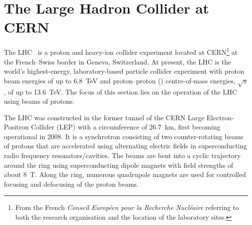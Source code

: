 \section{The Large Hadron Collider at CERN}%
\label{sec:lhc}

The LHC~\cite{Evans:2008zzb} is a proton and heavy-ion collider experiment
located at CERN\footnote{From the French \emph{Conseil Européen pour la
    Recherche Nucléaire} referring to both the research organisation and the
  location of the laboratory sites.} at the French--Swiss border in Geneva,
Switzerland. At present, the LHC is the world's highest-energy, laboratory-based
particle collider experiment with proton beam energies of up to \SI{6.8}{\TeV}
and proton--proton (\pp) centre-of-mass energies, $\sqrt{s}$, of up to
\SI{13.6}{\TeV}. The focus of this section lies on the operation of the LHC
using beams of protons.

The LHC was constructed in the former tunnel of the CERN Large Electron-Positron
Collider (LEP) with a circumference of \SI{26.7}{\kilo\metre}, first becoming
operational in 2008. It is a synchrotron consisting of two counter-rotating
beams of protons that are accelerated using alternating electric fields in
superconducting radio frequency resonators/cavities. The beams are bent into a
cyclic trajectory around the ring using superconducting dipole magnets with
field strengths of about \SI{8}{\tesla}. Along the ring, numerous quadrupole
magnets are used for controlled focusing and defocusing of the proton beams.

